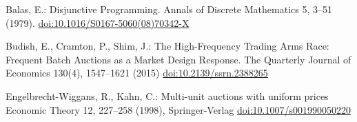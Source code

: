 \documentclass[11pt,parskip=full]{scrartcl}%
\begin{document}
%
%


\begin{thebibliography}{2}
%

Balas, E.:
Disjunctive Programming.
Annals of Discrete Mathematics 5, 3--51 (1979).
\url{doi:10.1016/S0167-5060(08)70342-X}

Budish, E., Cramton, P., Shim, J.:
The High-Frequency Trading Arms Race: Frequent Batch Auctions as a Market Design Response.
The Quarterly Journal of Economics 130(4), 1547--1621 (2015)
\url{doi:10.2139/ssrn.2388265}

Engelbrecht-Wiggans, R., Kahn, C.:
Multi-unit auctions with uniform prices
Economic Theory 12, 227--258 (1998), Springer-Verlag
\url{doi:10.1007/s001990050220}

\end{thebibliography}
\end{document}
